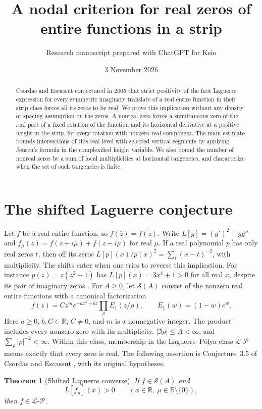 \documentclass[11pt,a4paper]{article}
\title{A nodal criterion for real zeros of entire functions in a strip}
\author{Research manuscript prepared with ChatGPT for Keio}
\date{3 November 2026}
\newtheorem{theorem}{Theorem}[section]
\numberwithin{equation}{section}
\begin{document}
\maketitle
\begin{abstract}
Csordas and Escassut conjectured in 2005 that strict positivity of the first
Laguerre expression for every symmetric imaginary translate of a real entire
function in their strip class forces all its zeros to be real.
We prove this implication without any density or spacing assumption on the
zeros. A nonreal zero forces a simultaneous zero of the real part of a
fixed rotation of the function and its horizontal derivative at a positive
height in the strip, for every rotation with nonzero real component.
The main estimate bounds intersections of this real level with selected
vertical segments by applying Jensen's formula in the complexified height
variable. We also bound the number of nonreal zeros by a sum of local
multiplicities at horizontal tangencies, and characterize when the set of
such tangencies is finite.
\end{abstract}

\section{The shifted Laguerre conjecture}
Let $f$ be a real entire function, so $f(\bar z)=\overline{f(z)}$.
Write $L[g]=(g')^2-gg''$ and
$f_\mu(z)=f(z+i\mu)+f(z-i\mu)$ for real $\mu$. If a real polynomial $p$
has only real zeros $t$, then off its zeros
$L[p](x)/p(x)^2=\sum_t(x-t)^{-2}$, with multiplicity.
The shifts enter when one tries to reverse this implication. For instance
$p(z)=z(z^2+1)$ has $L[p](x)=3x^4+1>0$ for all real $x$, despite
its pair of imaginary zeros \cite{CE}.
For $A\ge0$, let $\mathcal S(A)$ consist of the nonzero real entire functions
with a canonical factorization
\begin{equation}\label{eq:phase-canonical}
 f(z)=Cz^m e^{-az^2+bz}\prod_{\rho} E_1(z/\rho),
 \qquad E_1(w)=(1-w)e^w .
\end{equation}
Here $a\ge0$, $b,C\in\mathbb R$, $C\ne0$, and $m$ is a nonnegative
integer. The product includes every nonzero zero with its multiplicity,
$|\Im\rho|\le A<\infty$, and $\sum_\rho|\rho|^{-2}<\infty$.
Within this class, membership in the Laguerre--P\'olya class
$\mathcal L\text{-}\mathcal P$ means exactly that every zero is real.
The following assertion is Conjecture~3.5 of Csordas and Escassut
\cite[p.~337]{CE}, with its original hypotheses.
\begin{theorem}[Shifted Laguerre converse]\label{thm:original}
If $f\in\mathcal S(A)$ and
\[
             L[f_\mu](x)>0
             \qquad(x\in\mathbb R,\ \mu\in\mathbb R\setminus\{0\}),
\]
then $f\in\mathcal L\text{-}\mathcal P$.
\end{theorem}
\end{document}
